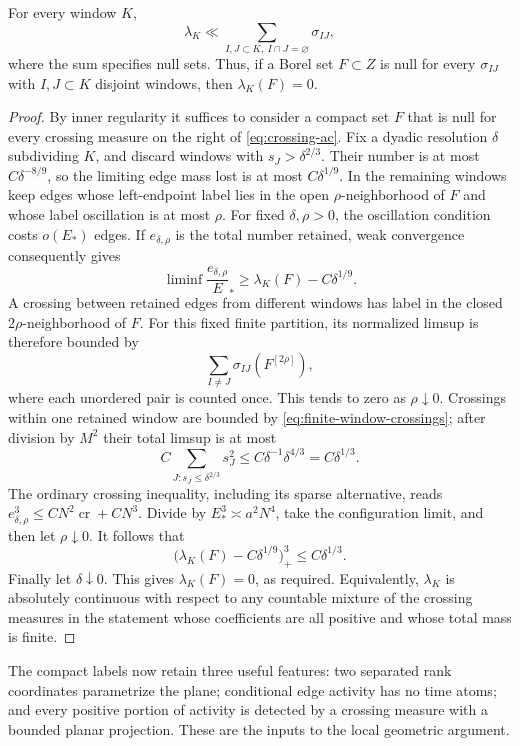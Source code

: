\begin{lemma}\label{lem:edge-crossing-ac}
For every window $K$,
\begin{equation}\label{eq:crossing-ac}
 \lambda_K\ll\sum_{I,J\subset K,\ I\cap J=\varnothing}\sigma_{IJ},
\end{equation}
where the sum specifies null sets.  Thus, if a Borel set $F\subset Z$ is null for every
$\sigma_{IJ}$ with $I,J\subset K$ disjoint windows, then
$\lambda_K(F)=0$.
\end{lemma}
\begin{proof}
By inner regularity it suffices to consider a compact set $F$ that is
null for every crossing measure on the right of \eqref{eq:crossing-ac}.
Fix a dyadic resolution $\delta$ subdividing $K$, and discard windows with
$s_J>\delta^{2/3}$.  Their number is at most $C\delta^{-8/9}$, so the
limiting edge mass lost is at most $C\delta^{1/9}$.
In the remaining windows keep edges whose left-endpoint label lies in
the open $\rho$-neighborhood of $F$ and whose label oscillation is at
most $\rho$.  For fixed $\delta,\rho>0$, the oscillation condition
costs $o(E_*)$ edges.  If $e_{\delta,\rho}$ is the total number retained,
weak convergence consequently gives
\[
 \liminf \frac{e_{\delta,\rho}}E_*
 \ge \lambda_K(F)-C\delta^{1/9}.
\]
A crossing between retained edges from different windows has label
in the closed $2\rho$-neighborhood of $F$.  For this fixed finite
partition, its normalized limsup is therefore bounded by
\[
 \sum_{I\ne J}\sigma_{IJ}(F^{[2\rho]}),
\]
where each unordered pair is counted once.  This tends to zero as
$\rho\downarrow0$.  Crossings within one retained window are bounded
by \eqref{eq:finite-window-crossings}; after division by $M^2$ their
total limsup is at most
\[
 C\sum_{J:s_J\le\delta^{2/3}}s_J^2
 \le C\delta^{-1}\delta^{4/3}=C\delta^{1/3}.
\]
The ordinary crossing inequality, including its sparse alternative,
reads $e_{\delta,\rho}^3\le C N^2\operatorname{cr}+C N^3$.
Divide by $E_*^3\asymp a^2N^4$, take the configuration limit, and then
let $\rho\downarrow0$.  It follows that
\[
 \bigl(\lambda_K(F)-C\delta^{1/9}\bigr)_+^3
 \le C\delta^{1/3}.
\]
Finally let $\delta\downarrow0$.  This gives $\lambda_K(F)=0$, as
required.  Equivalently, $\lambda_K$ is absolutely continuous with
respect to any countable mixture of the crossing measures in the
statement whose coefficients are all positive and whose total mass is finite.
\end{proof}

The compact labels now retain three useful features: two separated
rank coordinates parametrize the plane; conditional edge activity
has no time atoms; and every positive portion of activity is detected
by a crossing measure with a bounded planar projection.  These are
the inputs to the local geometric argument.
